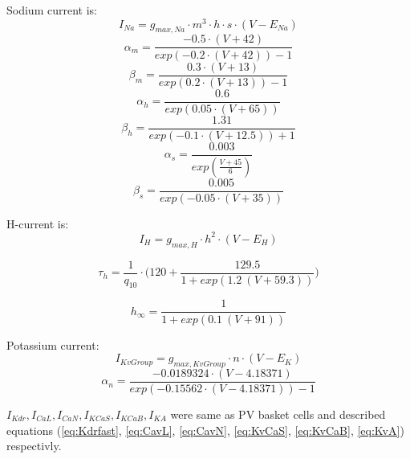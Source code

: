 \documentclass[12pt]{article}
\begin{document}
Sodium current is:
\begin{equation}
\label{eq:Navcck}
I_{Na} = g_{max, Na} \cdot m^3 \cdot h \cdot s \cdot (V - E_{Na})
\end{equation}
\begin{equation}
\alpha_m = \frac{-0.5 \cdot (V + 42)}{exp(-0.2\cdot(V+42)) - 1}
\end{equation}
\begin{equation}
\beta_m = \frac{0.3 \cdot (V + 13)}{exp(0.2\cdot(V+13)) - 1}
\end{equation}
\begin{equation}
\alpha_h = \frac{0.6}{exp(0.05\cdot(V+65))}
\end{equation}
\begin{equation}
\beta_h = \frac{1.31}{exp(-0.1\cdot(V+12.5)) + 1}
\end{equation}
\begin{equation}
\alpha_s = \frac{0.003}{exp( \frac{V+45}{6})}
\end{equation}
\begin{equation}
\beta_s = \frac{0.005}{exp(-0.05\cdot(V+35))}
\end{equation}

H-current is:
\begin{equation}
\label{eq:HCN}
I_{H} = g_{max, H} \cdot h^2 \cdot (V - E_{H})
\end{equation}

\begin{equation}
\tau_{h} = \frac{1}{q_{10}} \cdot \Bigg(120 + \frac{129.5}{1 + exp(1.2 \ (V + 59.3))} \Bigg)
\end{equation}

\begin{equation}
h_{\infty} =  \frac{1}{1 + exp(0.1 \ (V + 91))}
\end{equation}

Potassium current:
\begin{equation}
\label{eq:KvGroup}
I_{KvGroup} = g_{max, KvGroup} \cdot n \cdot (V - E_K)
\end{equation}
\begin{equation}
\alpha_n = \frac{-0.0189324 \cdot (V - 4.18371) }{exp(-0.15562\cdot (V - 4.18371)) - 1}
\end{equation}

$ I_{Kdr}, I_{CaL}, I_{CaN},I_{KCaS}, I_{KCaB}, I_{KA}$ were same as PV basket cells and described equations (\ref{eq:Kdrfast}, \ref{eq:CavL}, \ref{eq:CavN}, \ref{eq:KvCaS}, \ref{eq:KvCaB}, \ref{eq:KvA}) respectivly.
\end{document}
